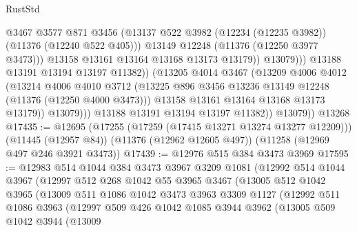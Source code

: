 \begin{lexlean}{RustStd}
\begin{coremodule}
{\begin{coremodule}
{{{{{{{{{{{{{{{{{{{{{{{{{{{{{{{{{{{{{{{{{{{{{{{{{{{{{{{{{{{{{{{{{{{{{{{{{{{{{{{{{{{{{                                @3467
                                @3577
                                @871
                                @3456
                                (@13137
                                  @522
                                  @3982
                                  (@12234 (@12235 @3982))
                                  (@11376 (@12240 @522 @405)))
                                @13149
                                @12248
                                (@11376 (@12250 @3977 @3473)))
                              @13158
                              @13161
                              @13164
                              @13168
                              @13173
                              @13179))
                          @13079)))
                    @13188
                    @13191
                    @13194
                    @13197
                    @11382))
                (@13205
                  @4014
                  @3467
                  (@13209
                    @4006
                    @4012
                    (@13214
                      @4006
                      @4010
                      @3712
                      (@13225 @896 @3456 @13236 @13149 @12248 (@11376 (@12250 @4000 @3473)))
                      @13158
                      @13161
                      @13164
                      @13168
                      @13173
                      @13179))
                  @13079)))
            @13188
            @13191
            @13194
            @13197
            @11382))
        @13079))
    @13268
@17435 := @12695
    (@17255 (@17259 (@17415 @13271 @13274 @13277 @12209)))
    (@11445 (@12957 @84))
    (@11376 (@12962 @12605 @497))
    (@11258 (@12969 @497 @246 @3921 @3473))
@17439 := @12976 @515 @384 @3473 @3969
@17595 := @12983
    @514
    @1044
    @384
    @3473
    @3967
    @3209
    @1081
    (@12992
      @514
      @1044
      @3967
      (@12997
        @512
        @268
        @1042
        @55
        @3965
        @3467
        (@13005
          @512
          @1042
          @3965
          (@13009
            @511
            @1086
            @1042
            @3473
            @3963
            @3309
            @1127
            (@12992
              @511
              @1086
              @3963
              (@12997
                @509
                @426
                @1042
                @1085
                @3944
                @3962
                (@13005
                  @509
                  @1042
                  @3944
                  (@13009
}}}}}}}}}}}}}}}}}}}}}}}}}}}}}}}}}}}}}}}}}}}}}}}}}}}}}}}}}}}}}}}}}}}}}}}}}}}}}}}}}}}}}
\end{coremodule}}
\end{coremodule}
\end{lexlean}
